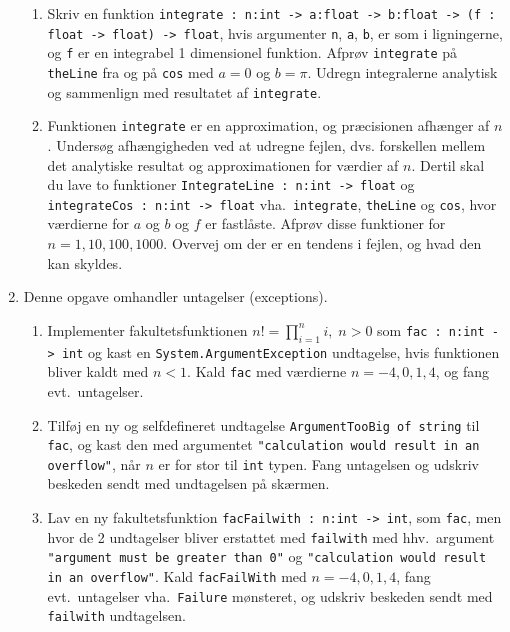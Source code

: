 \documentclass[a4paper,12pt]{article}
\begin{document}
\begin{enumerate}[label=5ø.\arabic*,start=0]
  \begin{enumerate}
  \item Skriv en funktion \lstinline{integrate : n:int -> a:float -> b:float -> (f : float -> float) -> float}, hvis argumenter \lstinline{n}, \lstinline{a}, \lstinline{b}, er som i ligningerne, og \lstinline{f} er en integrabel 1 dimensionel funktion. Afprøv \lstinline{integrate} på \lstinline{theLine} fra  og på \lstinline{cos} med $a=0$ og $b=\pi$. Udregn integralerne analytisk og sammenlign med resultatet af \lstinline{integrate}.
  \item Funktionen \lstinline{integrate} er en approximation, og præcisionen afhænger af $n$. Undersøg afhængigheden ved at udregne fejlen, dvs. forskellen mellem det analytiske resultat og approximationen for værdier af $n$. Dertil skal du lave to funktioner \lstinline{IntegrateLine : n:int -> float} og \lstinline{integrateCos : n:int -> float} vha.\ \lstinline{integrate}, \lstinline{theLine} og \lstinline{cos}, hvor værdierne for $a$ og $b$ og $f$ er fastlåste. Afprøv disse funktioner for $n = 1, 10, 100, 1000$. Overvej om der er en tendens i fejlen, og hvad den kan skyldes.
  \end{enumerate}
\item Denne opgave omhandler untagelser (exceptions).
  \begin{enumerate}
  \item Implementer fakultetsfunktionen $n! = \prod_{i=1}^ni,\; n >0$ som \lstinline{fac : n:int -> int} og kast en \lstinline{System.ArgumentException} undtagelse, hvis funktionen bliver kaldt med $n < 1$. Kald \lstinline{fac} med værdierne $n=-4,0,1,4$, og fang evt.\ untagelser.
  \item \label{fac} Tilføj en ny og selfdefineret undtagelse \lstinline{ArgumentTooBig of string} til \lstinline{fac}, og kast den med argumentet \lstinline{"calculation would result in an overflow"}, når $n$ er for stor til \lstinline{int} typen. Fang untagelsen og udskriv beskeden sendt med undtagelsen på skærmen.
  \item Lav en ny fakultetsfunktion \lstinline{facFailwith : n:int -> int}, som \lstinline{fac}, men hvor de 2 undtagelser bliver erstattet med \lstinline{failwith} med hhv.\ argument \lstinline{"argument must be greater than 0"} og \lstinline{"calculation would result in an overflow"}. Kald \lstinline{facFailWith} med $n=-4,0,1,4$, fang evt.\ untagelser vha.\ \lstinline{Failure} mønsteret, og udskriv beskeden sendt med \lstinline{failwith} undtagelsen.
  \end{enumerate}

\end{enumerate}
\end{document}

